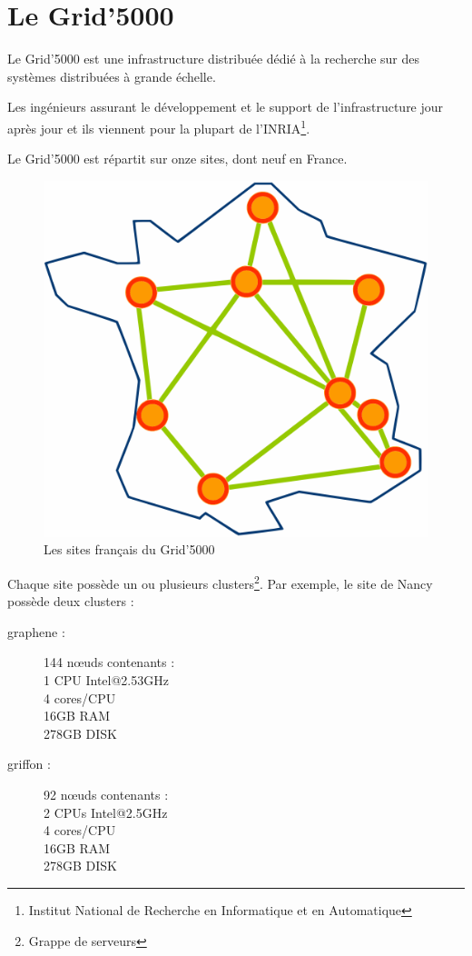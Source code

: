 \documentclass[12pt]{report}
\begin{document}
                        \newpage
		\section{Le Grid'5000}
		\label{defgrid}
		Le Grid'5000 est une infrastructure distribuée dédié à la recherche sur des systèmes distribuées à grande échelle.

		Les ingénieurs assurant le développement et le support de l'infrastructure jour après jour et ils viennent pour la plupart	de l'INRIA\footnote{Institut National de Recherche en Informatique et en Automatique}.

		Le Grid'5000 est répartit sur onze sites, dont neuf en France.

		\begin{figure}[H]
			\begin{center}
				\includegraphics[width=0.4\linewidth]{images/Site_map.png}
				\caption{Les sites français du Grid'5000}
			\end{center}
		\end{figure}

		Chaque site possède un ou plusieurs clusters\footnote{Grappe de serveurs}. Par exemple, le site de Nancy possède deux clusters :
		
		\begin{description}
			\item[graphene :] 144 nœuds contenants :\\
			1 CPU Intel@2.53GHz\\
			4 cores/CPU\\
			16GB RAM\\
			278GB DISK
			\item[griffon :] 92 nœuds contenants :\\
			2 CPUs Intel@2.5GHz\\
			4 cores/CPU\\
			16GB RAM\\
			278GB DISK
		\end{description}
                \newpage
                
\end{document}
